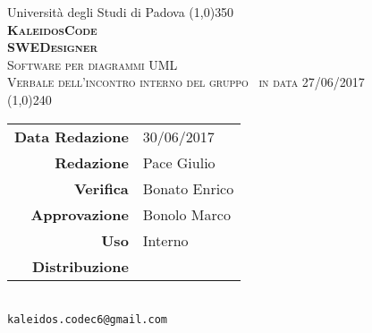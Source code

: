 \documentclass[a4paper,12pt]{article}
\author{KaleidosCode}
\date{29/05/2017}
\begin{document}
	\begin{titlepage}
		\centering Università degli Studi di Padova
		\line(1,0){350}\\
		\vspace{0.4cm}
		{\bfseries\scshape\LARGE KaleidosCode\\}
		\vspace{0.4cm}
		{\bfseries\scshape\LARGE SWEDesigner\\}
		{\scshape\Large Software per diagrammi UML\\}
		\vspace{1cm}
		{\scshape\Large Verbale dell'incontro interno del gruppo \kaleidoscode\ in data 27/06/2017 \\}		%
		\vspace{1.4cm}
		\logo
		\vspace{1.2cm}
		\line(1,0){240}\\
		\begin{tabular}{r|l}
			{\hfill \textbf{Data Redazione}} 	& 30/06/2017\\	%
			{\hfill \textbf{Redazione}} 		& Pace Giulio\\
			{\hfill \textbf{Verifica}} 			& Bonato Enrico\\
			{\hfill \textbf{Approvazione}} 		& Bonolo Marco\\
			{\hfill \textbf{Uso}} 				& Interno\\
			{\hfill \textbf{Distribuzione}} 	& \kaleidoscode\\
		\end{tabular}\\
		\vspace{2cm}
		\texttt{kaleidos.codec6@gmail.com}
	\end{titlepage}

	\pagestyle{mymain}
	\newpage
		
		
	\label{LastPage}
\end{document}
